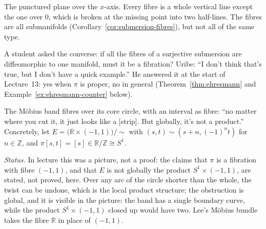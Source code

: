 \documentclass[11pt]{report}
\makeatletter
\newcounter{excounter}[section]
\newcommand{\exlabel}[1]{\edef\@currentlabel{\arabic{section}.\arabic{excounter}}\label{#1}}
\newcommand{\leeref}[1]{\par\smallskip{\raggedleft\footnotesize\textsc{Lee}:\ #1\par}}
\makeatother
\begin{document}
The punctured plane over the $x$-axis. Every fibre is a whole vertical line except the one over $0$, which is broken at the missing point into two half-lines. The fibres are all submanifolds (Corollary~\ref{cor:submersion-fibres}), but not all of the same type.

A student asked the converse: if all the fibres of a surjective submersion are diffeomorphic to one manifold, must it be a fibration? Uribe: ``I don't think that's true, but I don't have a quick example.'' He answered it at the start of Lecture~13: yes when $\pi$ is proper, no in general (Theorem~\ref{thm:ehresmann} and Example~\ref{ex:ehresmann-counter} below).

\begin{exbox}\exlabel{ex:mobius}
The Möbius band fibres over its core circle, with an interval as fibre: ``no matter where you cut it, it just looks like a [strip]. But globally, it's not a product.'' Concretely, let $E = \big(\mathbb{R} \times (-1, 1)\big)/{\sim}$ with $(s, t) \sim (s + n, (-1)^n t)$ for $n \in \mathbb{Z}$, and $\pi[s, t] = [s] \in \mathbb{R}/\mathbb{Z} \cong S^1$.
\leeref{Example 10.3}
\end{exbox}

\textit{Status.} In lecture this was a picture, not a proof: the claims that $\pi$ is a fibration with fibre $(-1, 1)$, and that $E$ is not globally the product $S^1 \times (-1, 1)$, are stated, not proved, here. Over any arc of the circle shorter than the whole, the twist can be undone, which is the local product structure; the obstruction is global, and it is visible in the picture: the band has a single boundary curve, while the product $S^1 \times (-1, 1)$ closed up would have two. Lee's Möbius bundle takes the fibre $\mathbb{R}$ in place of $(-1, 1)$.
\end{document}
